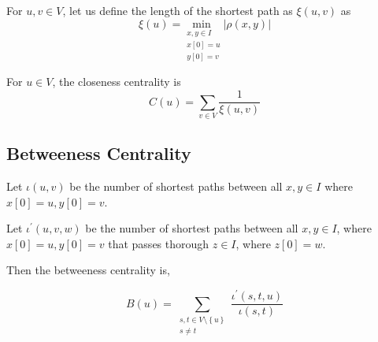 \documentclass[]{article}
\begin{document}
For $u,v \in V$, let us define the length of the shortest path as $\xi\left(u,v\right)$ as
\[
\xi\left(u\right) = \underset{\substack{x,y \in I\\ x[0]=u\\y[0]=v}}{\text{min }}\left\vert \rho\left(x,y\right)\right\vert
\]

For $u \in V$, the closeness centrality is
\[
C(u) = \sum_{v \in V} \frac{1}{\xi\left(u,v\right)}
\]

\subsection{Betweeness Centrality}

Let $\iota(u,v)$ be the number of shortest paths between all $x,y \in I$ where $x[0] = u, y[0]=v$. 

Let $\iota^\prime\left(u,v,w\right)$ be the number of shortest paths between all $x,y \in I$, where $x[0] = u, y[0] = v$ that passes thorough $z \in I$, where $z[0] = w$.

Then the betweeness centrality is,

\[
B\left(u\right) = \sum_{\substack{s,t \in V\setminus\left\{u\right\}\\s \ne t}}\frac{\iota^\prime\left(s,t,u\right)}{\iota\left(s,t\right)}
\]
\end{document}
